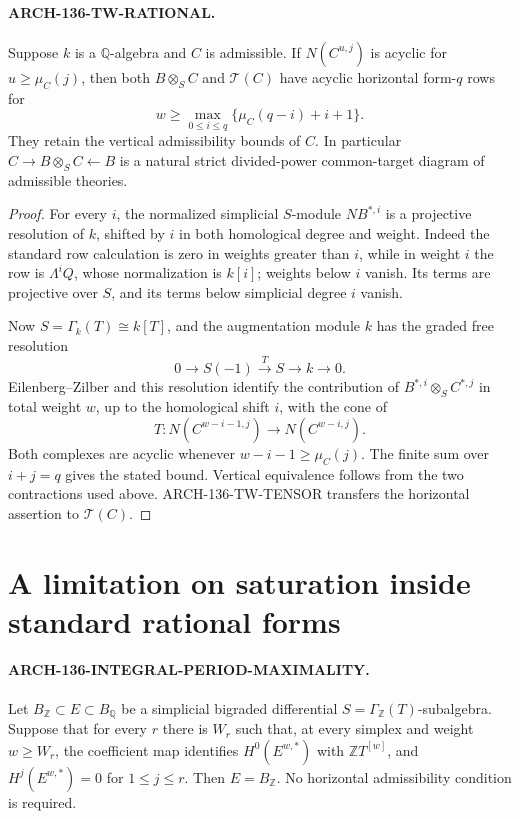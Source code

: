 \paragraph{ARCH-136-TW-RATIONAL.}
Suppose \(k\) is a \(\mathbb Q\)-algebra and \(C\) is admissible. If
\(N(C^{u,j})\) is acyclic for \(u\geq\mu_C(j)\), then both
\(B\otimes_S C\) and \(\mathcal T(C)\) have acyclic horizontal form-\(q\) rows for
\[
 w\geq \max_{0\leq i\leq q}\{\mu_C(q-i)+i+1\}.
\]
They retain the vertical admissibility bounds of \(C\). In particular
\(C\to B\otimes_S C\leftarrow B\) is a natural strict divided-power common-target diagram of admissible theories.

\begin{proof}
For every \(i\), the normalized simplicial \(S\)-module \(NB^{*,i}\) is a projective resolution of \(k\), shifted by \(i\) in both homological degree and weight. Indeed the standard row calculation is zero in weights greater than \(i\), while in weight \(i\) the row is \(\Lambda^iQ\), whose normalization is \(k[i]\); weights below \(i\) vanish. Its terms are projective over \(S\), and its terms below simplicial degree \(i\) vanish.

Now \(S=\Gamma_k(T)\cong k[T]\), and the augmentation module \(k\) has the graded free resolution
\[
 0\longrightarrow S(-1)\xrightarrow{T}S\longrightarrow k\longrightarrow0.
\]
Eilenberg--Zilber and this resolution identify the contribution of
\(B^{*,i}\otimes_S C^{*,j}\) in total weight \(w\), up to the homological shift \(i\), with the cone of
\[
 T:N(C^{w-i-1,j})\longrightarrow N(C^{w-i,j}).
\]
Both complexes are acyclic whenever \(w-i-1\geq\mu_C(j)\). The finite sum over \(i+j=q\) gives the stated bound. Vertical equivalence follows from the two contractions used above. ARCH-136-TW-TENSOR transfers the horizontal assertion to \(\mathcal T(C)\).
\end{proof}

\section{A limitation on saturation inside standard rational forms}

\paragraph{ARCH-136-INTEGRAL-PERIOD-MAXIMALITY.}
Let \(B_{\mathbb Z}\subset E\subset B_{\mathbb Q}\) be a simplicial bigraded differential \(S=\Gamma_{\mathbb Z}(T)\)-subalgebra. Suppose that for every \(r\) there is \(W_r\) such that, at every simplex and weight \(w\geq W_r\), the coefficient map identifies \(H^0(E^{w,*})\) with \(\mathbb ZT^{[w]}\), and \(H^j(E^{w,*})=0\) for \(1\leq j\leq r\). Then \(E=B_{\mathbb Z}\). No horizontal admissibility condition is required.

